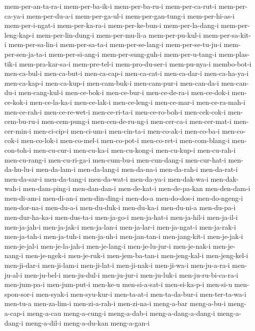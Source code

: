 {mem-per-an-ta-ra-i mem-per-ba-ik-i mem-per-ba-ru-i mem-per-ca-rut-i
mem-per-ca-ya-i mem-per-du-a-i mem-per-ga-ul-i mem-per-gan-tung-i
mem-per-hi-as-i mem-per-i-ngat-i mem-per-ka-ra-i mem-per-ke-bun-i
mem-per-la-dang-i mem-per-leng-kap-i mem-per-lin-dung-i mem-per-mu-li-a
mem-per-pu-kul-i mem-per-sa-kit-i mem-per-sa-lin-i mem-per-sa-ta-i
mem-per-se-lang-i mem-per-se-tu-ju-i mem-per-sen-ja-ta-i mem-per-si-ang-i
mem-per-sung-guh-i mem-per-u-tang-i mem-plas-tik-i mem-pra-kar-sa-i
mem-pre-tel-i mem-pro-du-ser-i mem-pu-nya-i membo-bot-i men-ca-bul-i
men-ca-but-i men-ca-cap-i men-ca-cat-i men-ca-dar-i men-ca-ha-ya-i
men-ca-kap-i men-ca-kup-i men-cam-buk-i men-cam-pur-i men-can-da-i
men-can-du-i men-cang-kul-i men-ce-bok-i men-ce-bur-i men-ce-de-ra-i
men-ce-dok-i men-ce-kok-i men-ce-la-ka-i men-ce-lak-i men-ce-leng-i
men-ce-mar-i men-ce-ra-mah-i men-ce-rah-i men-ce-re-wet-i men-ce-ri-ta-i
men-ce-ro-boh-i men-cek-cok-i men-cem-bu-ru-i men-cem-pung-i
men-cen-de-ru-ng-i men-cer-ca-i men-cer-mat-i men-cer-min-i men-ci-cip-i
men-ci-um-i men-cin-ta-i men-co-ak-i men-co-ba-i men-co-cok-i men-co-lok-i
men-co-mel-i men-co-pot-i men-co-ret-i men-com-blang-i men-con-toh-i
men-cu-cur-i men-cu-ka-i men-cu-kong-i men-cu-kup-i men-cu-rah-i
men-cu-rang-i men-cu-ri-ga-i men-cum-bu-i men-cun-dang-i men-cur-hat-i
men-da-hu-lu-i men-da-lam-i men-da-lang-i men-da-na-i men-da-rah-i
men-da-rat-i men-da-sar-i men-da-tang-i men-da-wat-i men-da-ya-i
men-dak-wa-i men-dak-wah-i men-dam-ping-i men-dan-dan-i men-de-kat-i
men-de-pa-kan men-den-dam-i men-di-am-i men-di-an-i men-din-ding-i
men-do-a men-do-dos-i men-do-ngeng-i men-dor-na-i men-du-a-i men-du-duk-i
men-du-ka-i men-du-ni-a men-du-pa-i men-dur-ha-ka-i men-dus-ta-i
men-ja-go-i men-ja-hat-i men-ja-hil-i men-ja-il-i men-ja-jah-i
men-ja-jak-i men-ja-lan-i men-ja-lar-i men-ja-ngat-i men-ja-rak-i
men-ja-tah-i men-ja-tuh-i men-ja-uh-i men-jan-tan-i men-jang-kit-i
men-je-jak-i men-je-jal-i men-je-la-jah-i men-je-lang-i men-je-lu-jur-i
men-je-nak-i men-je-nang-i men-je-ngek-i men-je-ruk-i men-jem-ba-tan-i
men-jeng-kal-i men-jeng-kel-i men-ji-dar-i men-ji-lam-i men-ji-lat-i
men-ji-nak-i men-ji-wa-i men-ju-a-ra-i men-ju-al-i men-ju-bel-i
men-ju-dul-i men-ju-jur-i men-ju-luk-i men-ju-ru-bi-ca-ra-i men-jum-pa-i
men-jum-put-i men-ke-u men-si-a-sat-i men-si-ka-p-i men-si-u
men-spon-sor-i men-syak-i men-syu-kur-i men-ta-at-i men-ta-da-bur-i
men-ter-ta-wa-i men-tu-a men-za-lim-i men-zi-a-rah-i men-zi-na-i
meng-a-bar meng-a-bu-i meng-a-cap-i meng-a-cau meng-a-cung-i meng-a-dab-i
meng-a-dang-a-dang-i meng-a-dang-i meng-a-dil-i meng-a-du-kan meng-a-gan-i
}
